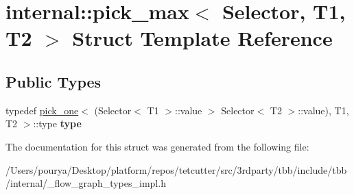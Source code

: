 \hypertarget{structinternal_1_1pick__max}{}\section{internal\+:\+:pick\+\_\+max$<$ Selector, T1, T2 $>$ Struct Template Reference}
\label{structinternal_1_1pick__max}
\subsection*{Public Types}
\begin{DoxyCompactItemize}
\item 
\hypertarget{structinternal_1_1pick__max_a60fdd5a857bd89bf5be40b4dd70cd0ff}{}typedef \hyperlink{structinternal_1_1pick__one}{pick\+\_\+one}$<$ (Selector$<$ T1 $>$\+::value $>$ Selector$<$ T2 $>$\+::value), T1, T2 $>$\+::type {\bfseries type}\label{structinternal_1_1pick__max_a60fdd5a857bd89bf5be40b4dd70cd0ff}

\end{DoxyCompactItemize}


The documentation for this struct was generated from the following file\+:\begin{DoxyCompactItemize}
\item 
/\+Users/pourya/\+Desktop/platform/repos/tetcutter/src/3rdparty/tbb/include/tbb/internal/\+\_\+flow\+\_\+graph\+\_\+types\+\_\+impl.\+h\end{DoxyCompactItemize}
